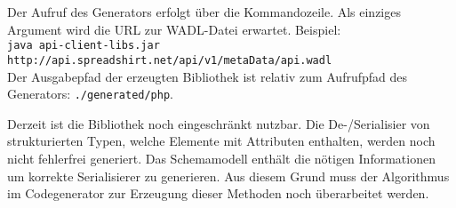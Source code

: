Der Aufruf des Generators erfolgt über die Kommandozeile. Als einziges Argument wird die \gls{URL} zur \gls{WADL}-Datei erwartet. Beispiel:\\ 
{\footnotesize \texttt{java api-client-libs.jar http://api.spreadshirt.net/api/v1/metaData/api.wadl}}\\
Der Ausgabepfad der erzeugten Bibliothek ist relativ zum Aufrufpfad des Generators: \texttt{./generated/php}.

Derzeit ist die Bibliothek noch eingeschränkt nutzbar. Die De-/Serialisier von strukturierten Typen, welche Elemente mit Attributen enthalten, werden noch nicht fehlerfrei generiert. Das Schemamodell enthält die nötigen Informationen um korrekte Serialisierer zu generieren. Aus diesem Grund muss der Algorithmus im Codegenerator zur Erzeugung dieser Methoden noch überarbeitet werden.

